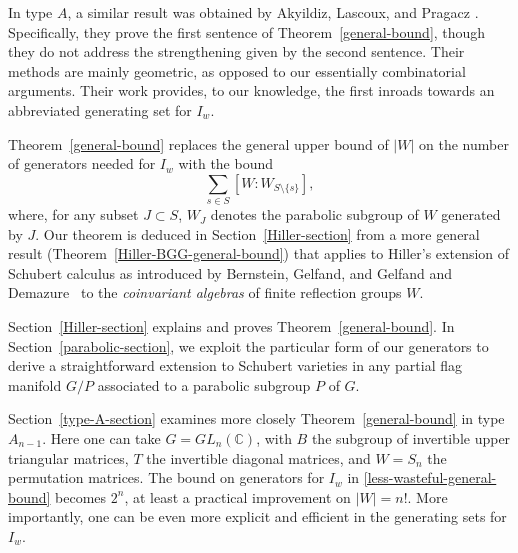 \documentclass[12pt,dvips]{amsart}
\theoremstyle{plain}
\theoremstyle{definition}
\theoremstyle{remark}
\numberwithin{equation}{section}
\def\CC{{\mathbb C}}
\begin{document}
In type $A$, a similar result was obtained by Akyildiz, Lascoux, and
Pragacz \cite[Theorem~2.2]{ALP}. Specifically, they prove the first
sentence of Theorem~\ref{general-bound}, though they do not address the
strengthening given by the second sentence. Their methods are mainly
geometric, as opposed to our essentially combinatorial arguments. Their
work provides, to our knowledge, the first inroads towards an abbreviated
generating set for $I_w$.

Theorem~\ref{general-bound} replaces the general upper bound
of $|W|$ on the number of generators needed for $I_w$ with the bound 
\begin{equation}
\label{less-wasteful-general-bound}
\sum_{s \in S} [W:W_{S\setminus\{s\}}],
\end{equation}
where, for any subset $J\subset S$, $W_J$ denotes the parabolic
subgroup of $W$ generated by $J$.  Our theorem is deduced in
Section~\ref{Hiller-section} from a more general result
(Theorem~\ref{Hiller-BGG-general-bound}) that applies to Hiller's
extension \cite[Chapter IV]{Hiller} of Schubert calculus as introduced
by Bernstein, Gelfand, and Gelfand \cite{BGG} and
Demazure~\cite{Demazure} to the \emph{coinvariant algebras} of finite
reflection groups $W$.


Section~\ref{Hiller-section} explains and proves Theorem~\ref{general-bound}.
In Section~\ref{parabolic-section}, we exploit the particular form of our
generators to derive a straightforward extension to Schubert varieties
in any partial flag manifold $G/P$ associated to 
a parabolic subgroup $P$ of $G$.

Section~\ref{type-A-section} examines
more closely Theorem~\ref{general-bound} in 
type $A_{n-1}$.  Here one can take $G=GL_n(\CC)$,
with $B$ the subgroup of invertible upper triangular matrices, 
$T$ the invertible 
diagonal matrices, and $W=S_n$ the permutation matrices. The bound 
on generators
for $I_w$ in \eqref{less-wasteful-general-bound} becomes $2^n$, 
at least a practical improvement on $|W|=n!$.
%
%
More importantly,
one can be even more explicit and efficient in the
generating sets for $I_w$. 
\end{document}
